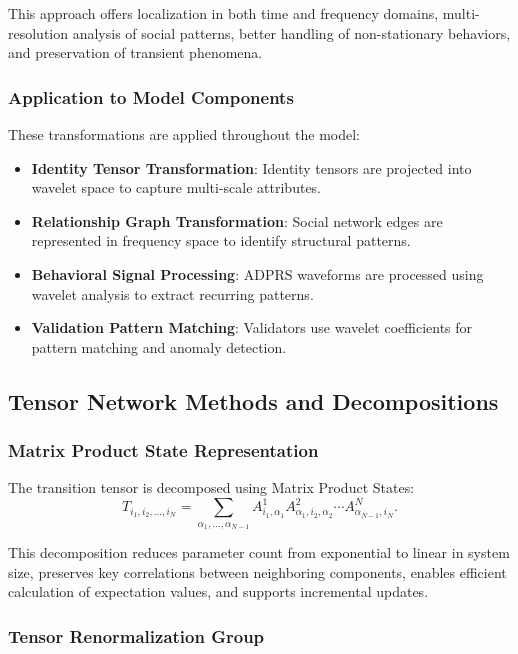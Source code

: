 \documentclass[11pt,a4paper]{article}
\begin{document}
This approach offers localization in both time and frequency domains, multi-resolution analysis of social patterns, better handling of non-stationary behaviors, and preservation of transient phenomena.

\subsubsection{Application to Model Components}

These transformations are applied throughout the model:
\begin{itemize}
\item \textbf{Identity Tensor Transformation}: Identity tensors are projected into wavelet space to capture multi-scale attributes.
\item \textbf{Relationship Graph Transformation}: Social network edges are represented in frequency space to identify structural patterns.
\item \textbf{Behavioral Signal Processing}: ADPRS waveforms are processed using wavelet analysis to extract recurring patterns.
\item \textbf{Validation Pattern Matching}: Validators use wavelet coefficients for pattern matching and anomaly detection.
\end{itemize}

\subsection{Tensor Network Methods and Decompositions}

\subsubsection{Matrix Product State Representation}

The transition tensor is decomposed using Matrix Product States:
\begin{equation}
T_{i_1,i_2,\ldots,i_N} = \sum_{\alpha_1,\ldots,\alpha_{N-1}} A^1_{i_1,\alpha_1} A^2_{\alpha_1,i_2,\alpha_2} \cdots A^N_{\alpha_{N-1},i_N}.
\end{equation}

This decomposition reduces parameter count from exponential to linear in system size, preserves key correlations between neighboring components, enables efficient calculation of expectation values, and supports incremental updates.

\subsubsection{Tensor Renormalization Group}
\end{document}

